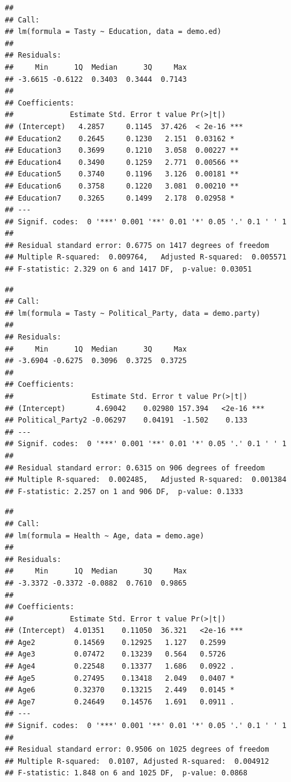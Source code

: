 \documentclass[
  12pt,
]{article}
\begin{document}
\begin{verbatim}
## 
## Call:
## lm(formula = Tasty ~ Education, data = demo.ed)
## 
## Residuals:
##     Min      1Q  Median      3Q     Max 
## -3.6615 -0.6122  0.3403  0.3444  0.7143 
## 
## Coefficients:
##             Estimate Std. Error t value Pr(>|t|)    
## (Intercept)   4.2857     0.1145  37.426  < 2e-16 ***
## Education2    0.2645     0.1230   2.151  0.03162 *  
## Education3    0.3699     0.1210   3.058  0.00227 ** 
## Education4    0.3490     0.1259   2.771  0.00566 ** 
## Education5    0.3740     0.1196   3.126  0.00181 ** 
## Education6    0.3758     0.1220   3.081  0.00210 ** 
## Education7    0.3265     0.1499   2.178  0.02958 *  
## ---
## Signif. codes:  0 '***' 0.001 '**' 0.01 '*' 0.05 '.' 0.1 ' ' 1
## 
## Residual standard error: 0.6775 on 1417 degrees of freedom
## Multiple R-squared:  0.009764,   Adjusted R-squared:  0.005571 
## F-statistic: 2.329 on 6 and 1417 DF,  p-value: 0.03051
\end{verbatim}

\begin{verbatim}
## 
## Call:
## lm(formula = Tasty ~ Political_Party, data = demo.party)
## 
## Residuals:
##     Min      1Q  Median      3Q     Max 
## -3.6904 -0.6275  0.3096  0.3725  0.3725 
## 
## Coefficients:
##                  Estimate Std. Error t value Pr(>|t|)    
## (Intercept)       4.69042    0.02980 157.394   <2e-16 ***
## Political_Party2 -0.06297    0.04191  -1.502    0.133    
## ---
## Signif. codes:  0 '***' 0.001 '**' 0.01 '*' 0.05 '.' 0.1 ' ' 1
## 
## Residual standard error: 0.6315 on 906 degrees of freedom
## Multiple R-squared:  0.002485,   Adjusted R-squared:  0.001384 
## F-statistic: 2.257 on 1 and 906 DF,  p-value: 0.1333
\end{verbatim}

\begin{verbatim}
## 
## Call:
## lm(formula = Health ~ Age, data = demo.age)
## 
## Residuals:
##     Min      1Q  Median      3Q     Max 
## -3.3372 -0.3372 -0.0882  0.7610  0.9865 
## 
## Coefficients:
##             Estimate Std. Error t value Pr(>|t|)    
## (Intercept)  4.01351    0.11050  36.321   <2e-16 ***
## Age2         0.14569    0.12925   1.127   0.2599    
## Age3         0.07472    0.13239   0.564   0.5726    
## Age4         0.22548    0.13377   1.686   0.0922 .  
## Age5         0.27495    0.13418   2.049   0.0407 *  
## Age6         0.32370    0.13215   2.449   0.0145 *  
## Age7         0.24649    0.14576   1.691   0.0911 .  
## ---
## Signif. codes:  0 '***' 0.001 '**' 0.01 '*' 0.05 '.' 0.1 ' ' 1
## 
## Residual standard error: 0.9506 on 1025 degrees of freedom
## Multiple R-squared:  0.0107, Adjusted R-squared:  0.004912 
## F-statistic: 1.848 on 6 and 1025 DF,  p-value: 0.0868
\end{verbatim}
\end{document}
